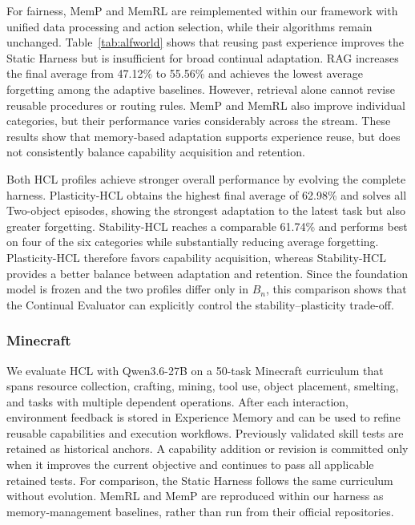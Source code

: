 \documentclass{article}
\begin{document}
For fairness, MemP and MemRL are reimplemented within our framework with unified data processing and action selection, while their algorithms remain unchanged.
Table~\ref{tab:alfworld} shows that reusing past experience improves the Static
Harness but is insufficient for broad continual adaptation. RAG increases the
final average from 47.12\% to 55.56\% and achieves the lowest average
forgetting among the adaptive baselines. However, retrieval alone cannot revise
reusable procedures or routing rules. MemP and MemRL also improve individual
categories, but their performance varies considerably across the
stream. These results show that memory-based adaptation supports experience
reuse, but does not consistently balance capability acquisition and retention.

Both HCL profiles achieve stronger overall performance by evolving the complete
harness. Plasticity-HCL obtains the highest final average of 62.98\% and
solves all Two-object episodes, showing the strongest adaptation to the latest
task but also greater forgetting. Stability-HCL reaches a comparable 61.74\%
and performs best on four of the six categories while substantially reducing
average forgetting. Plasticity-HCL therefore favors capability
acquisition, whereas Stability-HCL provides a better balance between adaptation
and retention. Since the foundation model is frozen and the two profiles differ
only in $B_n$, this comparison shows that the Continual Evaluator can
explicitly control the stability--plasticity trade-off.




\subsubsection{Minecraft}
\label{sec:minecraft_experiment}

We evaluate HCL with Qwen3.6-27B on a 50-task Minecraft curriculum that spans
resource collection, crafting, mining, tool use, object placement, smelting,
and tasks with multiple dependent operations. 
After each interaction, environment feedback is
stored in Experience Memory and can be used to refine reusable capabilities
and execution workflows. Previously validated skill tests are retained as
historical anchors. A capability addition or revision is committed only when
it improves the current objective and continues to pass all applicable retained
tests. For comparison, the Static Harness follows the same curriculum without
evolution. MemRL and MemP are reproduced within our harness as memory-management
baselines, rather than run from their official repositories.
\end{document}
